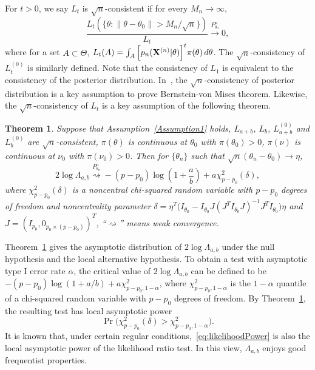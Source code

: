 \documentclass[11pt]{article}
\theoremstyle{plain}
\newtheorem{theorem}{\quad\quad Theorem}
\theoremstyle{definition}
\theoremstyle{remark}
\begin{document}
    For $t>0$, we say $L_t$ is $\sqrt{n}$-consistent if for every $M_n\to \infty$,
    $$
    \frac{L_t({\{\theta:\|\theta-\theta_0\|> M_n/\sqrt{n}\}})}{L_t}\xrightarrow{P_{\theta_0}^n} 0,
    $$
    where for a set $A\subset \Theta$, $L_t (A)=\int_{A} \Big[ {p_n(\mathbf{X}^{(n)}|\theta)} \Big]^{t} \pi(\theta) \, d \theta$.
    The $\sqrt{n}$-consistency of $L_t^{(0)}$ is similarly defined.
    Note that the consistency of $L_1$ is equivalent to the consistency of the posterior distribution.
    In~\cite{Kleijn2012The}, the $\sqrt{n}$-consistency of posterior distribution is a key assumption to prove Bernstein-von Mises theorem.
    Likewise, the $\sqrt{n}$-consistency of $L_t$ is a key assumption of the following theorem.



    \begin{theorem}\label{Thm:maintheorem}
        Suppose that Assumption~\ref{Assumption1} holds, $L_{a+b}$, $L_b$, $L_{a+b}^{(0)}$ and $L_b^{(0)}$ are $\sqrt{n}$-consistent, $\pi(\theta)$ is continuous at $\theta_0$ with $\pi(\theta_0)>0$, $\pi(\nu)$ is continuous at $\nu_0$ with $\pi(\nu_0)>0$. Then for $\{\theta_n\}$ such that $\sqrt{n}(\theta_n-\theta_0)\to \eta$, 
        $$
        2\log \Lambda_{a,b}\overset{P^n_{\theta_n}}{\rightsquigarrow}-{(p-p_0)}\log (1+\frac{a}{b})+{a}\chi^2_{p-p_0}(\delta),
        $$
        where $\chi^2_{p-p_0}(\delta)$ is a noncentral chi-squared random variable with $p-p_0$ degrees of freedom and noncentrality parameter $\delta=\eta^T\big( I_{\theta_0}-I_{\theta_0} J(J^T I_{\theta_0} J)^{-1}J^T I_{\theta_0}\big)\eta$ and $J=(I_{p_0},0_{p_0\times(p-p_0)})^T$,
``$\rightsquigarrow$'' means weak convergence.
    \end{theorem}
Theorem~\ref{Thm:maintheorem} gives the asymptotic distribution of $2\log \Lambda_{a,b}$ under the null hypothesis and the local alternative hypothesis.
To obtain a test with asymptotic type I error rate $\alpha$, the critical value of $2\log \Lambda_{a,b}$ can be defined to be $-(p-p_0)\log (1+a/b)+ a\chi^2_{p-p_0,1-\alpha}$, where $\chi^2_{p-p_0,1-\alpha}$ is the $1-\alpha$ quantile of a chi-squared random variable with $p-p_0$ degrees of freedom.
By Theorem~\ref{Thm:maintheorem}, the resulting test has local asymptotic power
\begin{equation}\label{eq:likelihoodPower}
\Pr \big( \chi^2_{p-p_0}(\delta)> \chi^2_{p-p_0,1-\alpha} \big).
\end{equation}
It is known that, under certain regular conditions,~\eqref{eq:likelihoodPower} is also the local asymptotic power of the likelihood ratio test. 
In this view, $\Lambda_{a,b}$ enjoys good frequentist properties.
\end{document}
